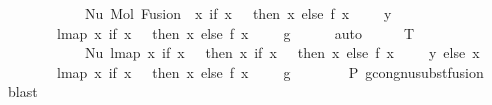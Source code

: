 \begin{isabellebody}
\ \ \ \ \ \ \ \ \ \ \ \ Nu\ {\isacharparenleft}{\kern0pt}Mol\ {\isacharparenleft}{\kern0pt}Fusion\ {}\ {\isacharparenleft}{\kern0pt}{\isacharparenleft}{\kern0pt}{\isasymlambda}x{\isachardot}{\kern0pt}\ if\ x\ {\isacharequal}{\kern0pt}\ {}\ then\ x\ else\ f\ {\isacharparenleft}{\kern0pt}x\ {\isacharminus}{\kern0pt}\ {}{\isacharparenright}{\kern0pt}\ {\isacharplus}{\kern0pt}\ {}{\isacharparenright}{\kern0pt}\ y{\isacharparenright}{\kern0pt}{\isacharparenright}{\kern0pt}\isanewline
\ \ \ \ \ \ \ \ {\isacharparenleft}{\kern0pt}lmap\ {\isacharparenleft}{\kern0pt}{\isasymlambda}x{\isachardot}{\kern0pt}\ if\ x\ {\isacharequal}{\kern0pt}\ {}\ then\ x\ else\ f\ {\isacharparenleft}{\kern0pt}x\ {\isacharminus}{\kern0pt}\ {}{\isacharparenright}{\kern0pt}\ {\isacharplus}{\kern0pt}\ {}{\isacharparenright}{\kern0pt}\ g{\isacharparenright}{\kern0pt}{\isacharparenright}{\kern0pt}{\isachardoublequoteclose}\isanewline
\ \ \ \ \isamarkupfalse%
\ auto\isanewline
\ \ \isamarkupfalse%
\ \isamarkupfalse%
\ T{}{\isacharcolon}{\kern0pt}\ {\isachardoublequoteopen}{\isachardot}{\kern0pt}{\isachardot}{\kern0pt}{\isachardot}{\kern0pt}\ {\isasymsimeq}\isanewline
\ \ \ \ \ \ \ \ \ \ \ \ Nu\ {\isacharparenleft}{\kern0pt}lmap\ {\isacharparenleft}{\kern0pt}{\isasymlambda}x{\isachardot}{\kern0pt}\ if\ x\ {\isacharequal}{\kern0pt}\ {}\ then\ {\isacharparenleft}{\kern0pt}{\isasymlambda}x{\isachardot}{\kern0pt}\ if\ x\ {\isacharequal}{\kern0pt}\ {}\ then\ x\ else\ f\ {\isacharparenleft}{\kern0pt}x\ {\isacharminus}{\kern0pt}\ {}{\isacharparenright}{\kern0pt}\ {\isacharplus}{\kern0pt}\ {}{\isacharparenright}{\kern0pt}\ y\ else\ x{\isacharparenright}{\kern0pt}\isanewline
\ \ \ \ \ \ \ \ {\isacharparenleft}{\kern0pt}lmap\ {\isacharparenleft}{\kern0pt}{\isasymlambda}x{\isachardot}{\kern0pt}\ if\ x\ {\isacharequal}{\kern0pt}\ {}\ then\ x\ else\ f\ {\isacharparenleft}{\kern0pt}x\ {\isacharminus}{\kern0pt}\ {}{\isacharparenright}{\kern0pt}\ {\isacharplus}{\kern0pt}\ {}{\isacharparenright}{\kern0pt}\ g{\isacharparenright}{\kern0pt}{\isacharparenright}{\kern0pt}{\isachardoublequoteclose}\isanewline
\ \ \ \ \ \ \isamarkupfalse%
\ P{}\ gcong{\isachardot}{\kern0pt}nu{\isacharunderscore}{\kern0pt}subst{\isacharunderscore}{\kern0pt}fusion{}\ \isamarkupfalse%
\ blast\isanewline
\ \ \isamarkupfalse%

\end{isabellebody}
